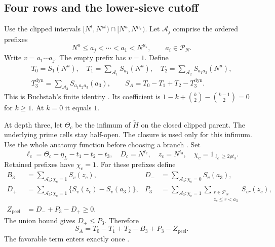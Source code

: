 \subsection{Four rows and the lower-sieve cutoff}

Use the clipped intervals
$[N^t,N^{\rho t})\cap[N^u,N^{\mu_*})$.
Let $\mathcal A_j$ comprise the ordered prefixes
\[
 N^u\le a_j<\cdots<a_1<N^{\mu_*},\qquad a_i\in\mathcal P_N.
\]
Write $v=a_1\cdots a_j$.
The empty prefix has $v=1$.
Define
\begin{equation}\label{eq:l3-buchstab}
\begin{gathered}
 T_0=S_1(N^u),\quad
 T_1=\sum_{\mathcal A_1}S_{a_1}(N^u),\quad
 T_2=\sum_{\mathcal A_2}S_{a_1a_2}(N^u),\\
 T_3^{\mathrm{dyn}}=\sum_{\mathcal A_3}S_{a_1a_2a_3}(a_3),
 \qquad S_A=T_0-T_1+T_2-T_3^{\mathrm{dyn}}.
\end{gathered}
\end{equation}
This is Buchstab's finite identity
\cite[(4.18)]{PaperII}.
Its coefficient is
$1-k+\binom{k}{2}-\binom{k-1}{2}=0$ for $k\ge1$.
At $k=0$ it equals $1$.

At depth three, let $\Theta_c$ be the infimum
of $\widetilde H$ on the closed clipped parent. The underlying prime
cells stay half-open. The closure is used only for this infimum.
Use the whole anatomy function before choosing a branch
\cite[(2.17d)--(2.17e), (4.19)]{PaperII}.
Set
\begin{equation}\label{eq:l3-row3-level}
 \ell_c=\Theta_c-\eta_L-t_1-t_2-t_3,\quad
 D_c=N^{\ell_c},\quad z_c=N^{t_3},\quad
 \chi_c=1_{\ell_c\ge2\rho t_3}.
\end{equation}
Retained prefixes have $\chi_c=1$.
For these prefixes define
\begin{equation}\label{eq:l3-peel}
\begin{aligned}
 B_3&=\sum_{\mathcal A_3:\chi_c=1}S_v(z_c),&
 D_-&=\sum_{\mathcal A_3:\chi_c=0}S_v(a_3),\\
 D_+&=\sum_{\mathcal A_3:\chi_c=1}\{S_v(z_c)-S_v(a_3)\},&
 P_3&=\sum_{\mathcal A_3:\chi_c=1}
       \sum_{\substack{r\in\mathcal P_N\\z_c\le r<a_3}}S_{vr}(z_c),\\
 Z_{\mathrm{peel}}&=D_-+P_3-D_+\ge0.&&
\end{aligned}
\end{equation}
The union bound gives $D_+\le P_3$.
Therefore
\begin{equation}\label{eq:l3-buchstab-peel}
 S_A=T_0-T_1+T_2-B_3+P_3-Z_{\mathrm{peel}}.
\end{equation}
The favorable term enters exactly once
\cite[(4.45)]{PaperII}.

